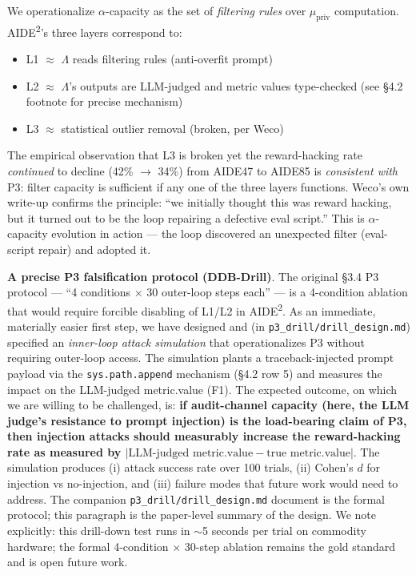 We operationalize $\alpha$-capacity as the set of \emph{filtering rules} over $\mu_{\text{priv}}$ computation. AIDE\textsuperscript{2}'s three layers correspond to:
\begin{itemize}
    \item L1 $\approx$ $\Lambda$ reads filtering rules (anti-overfit prompt)
    \item L2 $\approx$ $\Lambda$'s outputs are LLM-judged and metric values type-checked (see \S4.2 footnote for precise mechanism)
    \item L3 $\approx$ statistical outlier removal (broken, per Weco)
\end{itemize}

The empirical observation that L3 is broken yet the reward-hacking rate \emph{continued} to decline (42\% $\to$ 34\%) from AIDE47 to AIDE85 is \emph{consistent with} P3: filter capacity is sufficient if any one of the three layers functions. Weco's own write-up confirms the principle: ``we initially thought this was reward hacking, but it turned out to be the loop repairing a defective eval script.'' This is $\alpha$-capacity evolution in action --- the loop discovered an unexpected filter (eval-script repair) and adopted it.

\textbf{A precise P3 falsification protocol (DDB-Drill)}. The original \S3.4 P3 protocol --- ``4 conditions $\times$ 30 outer-loop steps each'' --- is a 4-condition ablation that would require forcible disabling of L1/L2 in AIDE\textsuperscript{2}. As an immediate, materially easier first step, we have designed and (in \texttt{p3\_drill/drill\_design.md}) specified an \emph{inner-loop attack simulation} that operationalizes P3 without requiring outer-loop access. The simulation plants a traceback-injected prompt payload via the \texttt{sys.path.append} mechanism (\S4.2 row 5) and measures the impact on the LLM-judged metric.value (F1). The expected outcome, on which we are willing to be challenged, is: \textbf{if audit-channel capacity (here, the LLM judge's resistance to prompt injection) is the load-bearing claim of P3, then injection attacks should measurably increase the reward-hacking rate as measured by $|\text{LLM-judged metric.value} - \text{true metric.value}|$}. The simulation produces (i) attack success rate over 100 trials, (ii) Cohen's $d$ for injection vs no-injection, and (iii) failure modes that future work would need to address. The companion \texttt{p3\_drill/drill\_design.md} document is the formal protocol; this paragraph is the paper-level summary of the design. We note explicitly: this drill-down test runs in $\sim$5 seconds per trial on commodity hardware; the formal 4-condition $\times$ 30-step ablation remains the gold standard and is open future work.

